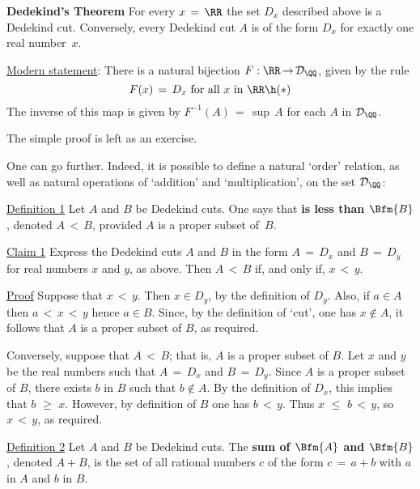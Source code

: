{{        {\bf Dedekind's Theorem} For every $x \,=\, {\RR}$ the set $D_{x}$ described above is a Dedekind cut.
    Conversely, every Dedekind cut $A$ is of the form $D_{x}$ for exactly one real number~$x$.

        \underline{Modern statement}: There is a natural bijection $F:{\RR} \,{\rightarrow}\, {\cal D_{{\QQ}}}$, given by the rule
        \begin{displaymath}
        F(x) \,=\, D_{x} \mbox{ for all $x$ in ${\RR}$} \h ({\ast})
        \end{displaymath}
    The inverse of this map is given by $F^{-1}(A) \,=\, {\sup}\,A$ for each $A$ in ${\cal D_{{\QQ}}}$.

\V

        The simple proof is left as an exercise.

\V

        One can go further. Indeed, it is possible to define a natural `order' relation,
    as well as natural operations of `addition' and `multiplication', on the set ${\cal D}_{{\QQ}}$:

\V

        \underline{Definition 1} Let $A$ and $B$ be Dedekind cuts. One says that {\bf {} is less than $\Bfm{B}$}, denoted $A\,<\,B$, provided $A$ is a proper subset of~$B$.

        \underline{Claim 1} Express the Dedekind cuts $A$ and $B$ in the form $A \,=\, D_{x}$ and $B \,=\, D_{y}$ for real numbers $x$ and $y$, as above.
    Then $A\,<\,B$ if, and only if, $x\,<\,y$.

        \underline{Proof} Suppose that $x\,<\,y$. Then $x{\in}D_{y}$, by the definition of $D_{y}$.
    Also, if $a{\in}A$ then $a\,<\,x\,<\,y$ hence $a{\in}B$. Since, by the definition of  `cut', one has $x \not \in A$, it follows that $A$ is a proper subset of $B$, as required.

        Conversely, suppose that $A\,<\,B$; that is, $A$ is a proper subset of $B$.
    Let $x$ and $y$ be the real numbers such that $A \,=\, D_{x}$ and $B \,=\, D_{y}$.
    Since $A$ is a proper subset of $B$, there exists $b$ in $B$ such that $b \not \in A$.
    By the definition of $D_{x}$, this implies that $b\,\,{\geq}\,\,x$. However, by definition of $B$ one has $b\,<\,y$.
    Thus $x\,\,{\leq}\,\,b\,<\,y$, so $x\,<\,y$, as required.

\V

        \underline{Definition  2} Let $A$ and $B$ be Dedekind cuts. The {\bf sum of $\Bfm{A}$ and $\Bfm{B}$}, denoted $A+B$,
    is the set of all rational numbers $c$ of the form $c \,=\, a+b$ with $a$ in $A$ and $b$ in $B$.

}}
